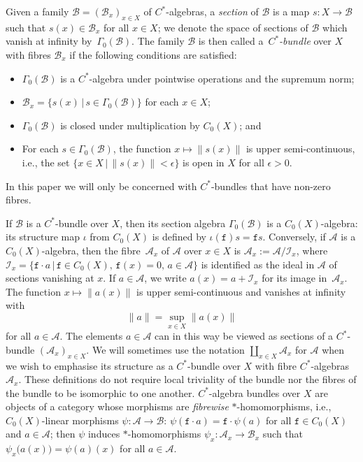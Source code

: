 \documentclass[11pt]{article}
\numberwithin{equation}{section}
\numberwithin{equation}{section}
\newcommand{\CI}{\mathcal{I}}
\def\alg{{\mathcal A}}
\def\balg{{\mathcal B}}
\begin{document}
Given a family $\balg=(\balg_x)_{x\in X}$ of $C^*$-algebras, a
\emph{section} of $\balg$ is
a map $s\colon X\to\balg$ such that $s(x)\in\balg_x$ for all $x\in X$; we
denote the space of sections of $\balg$ which vanish at infinity by~$\Gamma_0(\balg)$. The family $\balg$ is then called a~\emph{$C^*$-bundle} over $X$ with fibres $\balg_x$ if the following
conditions are satisfied:
\begin{itemize}\itemsep=0pt
\item
$\Gamma_0(\balg)$ is a $C^*$-algebra under pointwise operations and the
 supremum norm;
\item $\balg_x=\{s(x)\, |\, s\in\Gamma_0(\balg)\}$ for each
 $x\in X$;
\item $\Gamma_0(\balg)$ is closed under multiplication by
 $C_0(X)$; and
\item For each $s\in\Gamma_0(\balg)$, the function $x\mapsto \|s(x)\|$
is upper semi-continuous, i.e., the set
$\{x\in X \,|\, \|s(x)\|< \epsilon\}$ is open in $X$ for all $\epsilon>0$.
\end{itemize}
In this
paper we will only be concerned with $C^*$-bundles that have non-zero fibres.

If $\balg$ is a $C^*$-bundle over $X$, then its section algebra
$\Gamma_0(\balg)$ is a $C_0(X)$-algebra: its structure map $\iota$ from
$C_0(X)$ is defined by $\iota(\mathtt{f})s=\mathtt{f} s$. Conversely, if $\alg$ is a
$C_0(X)$-algebra, then the fibre~$\alg_x$ of $\alg$ over $x\in X$ is $\alg_x:=\alg/\CI_x$, where
$\CI_x=\{\mathtt{f}\cdot a\, |\, \mathtt{f}\in C_0(X) , \,
\mathtt{f}(x)=0 , \, a\in\alg\}$ is identified as the ideal in
$\alg$ of sections vanishing at $x$. If
$a\in\alg$, we write $a(x)=a+\CI_x$ for its image in~$\alg_x$. The
function $x\mapsto\|a(x)\|$ is upper semi-continuous
and vanishes at infinity with
\[
\|a\| = \sup_{x\in X} \big\|a(x)\big\|
\]
for all $a\in\alg$. The
elements $a\in \alg$ can in this way be viewed as sections of a
$C^*$-bundle $(\alg_x)_{x\in X}$. We will sometimes use the
notation $\coprod_{x\in X} \alg_x$ for $\alg$ when we wish to emphasise
its structure as a $C^*$-bundle over $X$ with fibre $C^*$-algebras
$\alg_x$. These definitions do not require
local triviality of the bundle nor the fibres of the bundle to be
isomorphic to one another. $C^*$-algebra bundles over $X$ are objects of a
category whose morphisms are \emph{fibrewise} $*$-homomorphisms,
i.e., $C_0(X)$-linear morphisms $\psi\colon \alg\to\balg$: $\psi(\mathtt{f}\cdot
a)=\mathtt{f}\cdot\psi(a)$ for all $\mathtt{f}\in C_0(X)$ and $a\in\alg$; then $\psi$
induces $*$-homomorphisms $\psi_x\colon \alg_x\to\balg_x$ such that
$\psi_x\big(a(x)\big)=\psi(a)(x)$ for all $a\in\alg$.
\end{document}
